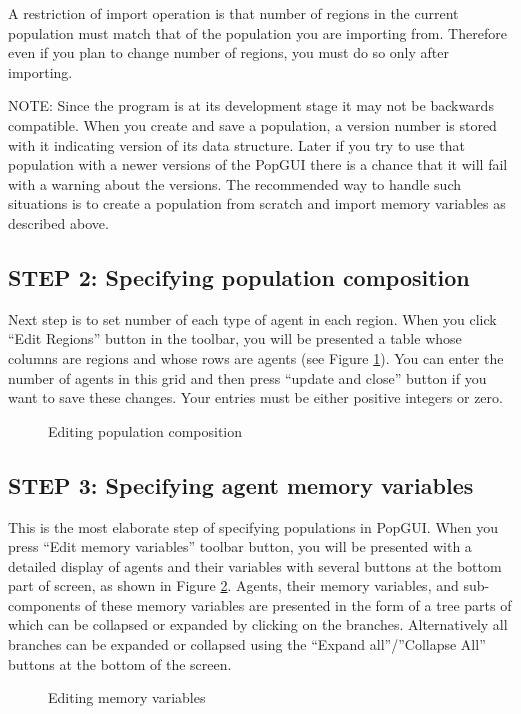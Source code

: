 \documentclass[10pt]{article}
\begin{document}
A restriction of import operation is that number of regions in the current population must match that of the population you are importing from. Therefore even if you plan to change number of regions, you must do so only after importing.

NOTE: Since the program is at its development stage it may not be backwards compatible. When you create and save a population, a version number is stored with it indicating version of its data structure. Later if you try to use that population with a newer versions of the PopGUI there is a chance that it will fail with a warning about the versions. The recommended way to handle such situations is to create a population from scratch and import memory variables as described above.

\subsection{STEP 2: Specifying population composition}
Next step is to set number of each type of agent in each region. When you click ``Edit Regions'' button in the toolbar, you will be presented a table whose columns are regions and whose rows are agents (see Figure \ref{fig:regions}). You can enter the number of agents in this grid and then press ``update and close'' button if you want to save these changes. Your entries must be either positive integers or zero. 
\begin{figure}
  \begin{center}
  \end{center}
  \caption{Editing population composition}
  \label{fig:regions}
\end{figure}

\subsection{STEP 3: Specifying agent memory variables}
This is the most elaborate step of specifying populations in PopGUI. When you press ``Edit memory variables'' toolbar button, you will be presented with a detailed display of agents and their variables with several buttons at the bottom part of screen, as shown in Figure \ref{fig:memvars}. Agents, their memory variables, and sub-components of these memory variables are presented in the form of a tree parts of which can be collapsed or expanded by clicking on the branches. Alternatively all branches can be expanded or collapsed using the ``Expand all''/''Collapse All'' buttons at the bottom of the screen. 
\begin{figure}
  \begin{center}
  \end{center}
  \caption{Editing memory variables}
  \label{fig:memvars}
\end{figure}
\end{document}
